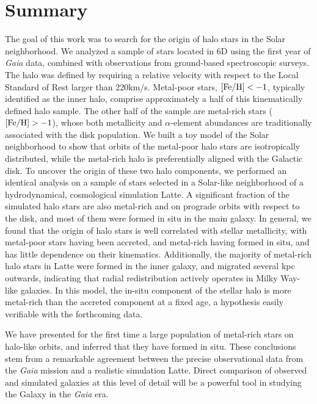 \documentclass[apj, twocolappendix, numberedappendix, appendixfloats]{emulateapj}
\begin{document}
\section{Summary}
\label{sec:summary}
The goal of this work was to search for the origin of halo stars in the Solar neighborhood.
We analyzed a sample of stars located in 6D using the first year of \emph{Gaia} data, combined with observations from ground-based spectroscopic surveys.
The halo was defined by requiring a relative velocity with respect to the Local Standard of Rest larger than 220\;km/s.
Metal-poor stars, $\rm[Fe/H]<-1$, typically identified as the inner halo, comprise approximately a half of this kinematically defined halo sample.
The other half of the sample are metal-rich stars ($\rm[Fe/H]>-1$), whose both metallicity and $\alpha$-element abundances are traditionally associated with the disk population.
We built a toy model of the Solar neighborhood to show that orbits of the metal-poor halo stars are isotropically distributed, while the metal-rich halo is preferentially aligned with the Galactic disk.
To uncover the origin of these two halo components, we performed an identical analysis on a sample of stars selected in a Solar-like neighborhood of a hydrodynamical, cosmological simulation Latte.
A significant fraction of the simulated halo stars are also metal-rich and on prograde orbits with respect to the disk, and most of them were formed in situ in the main galaxy.
In general, we found that the origin of halo stars is well correlated with stellar metallicity, with metal-poor stars having been accreted, and metal-rich having formed in situ, and has little dependence on their kinematics.
Additionally, the majority of metal-rich halo stars in Latte were formed in the inner galaxy, and migrated several kpc outwards, indicating that radial redistribution actively operates in Milky Way-like galaxies.
In this model, the in-situ component of the stellar halo is more metal-rich than the accreted component at a fixed age, a hypothesis easily verifiable with the forthcoming data.

We have presented for the first time a large population of metal-rich stars on halo-like orbits, and inferred that they have formed in situ.
These conclusions stem from a remarkable agreement between the precise observational data from the \emph{Gaia} mission and a realistic simulation Latte.
Direct comparison of observed and simulated galaxies at this level of detail will be a powerful tool in studying the Galaxy in the \emph{Gaia} era.
\end{document}
